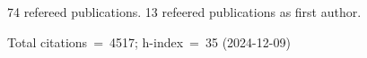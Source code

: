 74 refereed publications. 13 refeered publications as first author.

Total citations~=~4517; h-index~=~35 (2024-12-09)